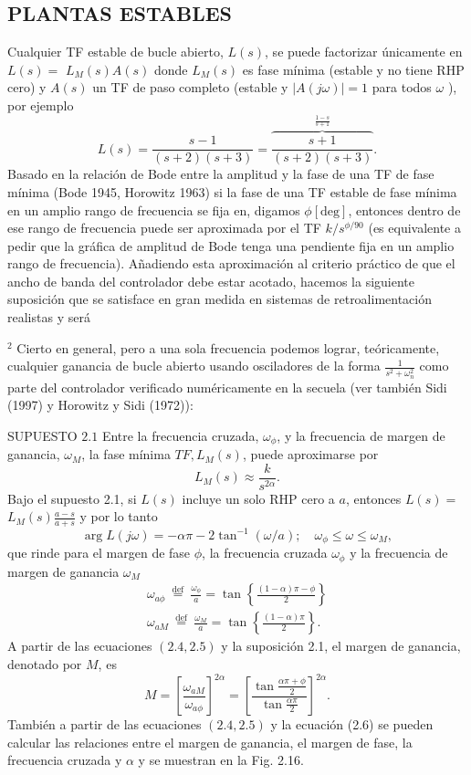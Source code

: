 \subsection{PLANTAS ESTABLES}
Cualquier TF estable de bucle abierto, $L(s)$, se puede factorizar únicamente en $L(s)=$ $L_{M}(s) A(s)$ donde $L_{M}(s)$ es fase mínima (estable y no tiene RHP cero) y $A(s)$ un TF de paso completo (estable y $| A(j \omega)|=1$ para todos $\omega$ ), por ejemplo
$$
L(s)=\frac{s-1}{(s+2)(s+3)}=\overbrace{\frac{s+1}{(s+2)(s+3)}}^{\frac{1-s}{s+1}} .
$$
Basado en la relación de Bode entre la amplitud y la fase de una TF de fase mínima (Bode 1945, Horowitz 1963) si la fase de una TF estable de fase mínima en un amplio rango de frecuencia se fija en, digamos $\phi[\mathrm{deg}]$, entonces dentro de ese rango de frecuencia puede ser aproximada por el TF $k / s^{\phi / 90}$ (es equivalente a pedir que la gráfica de amplitud de Bode tenga una pendiente fija en un amplio rango de frecuencia). Añadiendo esta aproximación al criterio práctico de que el ancho de banda del controlador debe estar acotado, hacemos la siguiente suposición que se satisface en gran medida en sistemas de retroalimentación realistas y será

${ }^{2}$ Cierto en general, pero a una sola frecuencia podemos lograr, teóricamente, cualquier ganancia de bucle abierto usando osciladores de la forma $\frac{1}{s^{2}+\omega_{n}^{2}}$ como parte del controlador verificado numéricamente en la secuela (ver también Sidi (1997) y Horowitz y Sidi (1972)):

SUPUESTO $2.1$ Entre la frecuencia cruzada, $\omega_{\phi}$, y la frecuencia de margen de ganancia, $\omega_{M}$, la fase mínima $T F, L_{M}(s)$, puede aproximarse por
$$
L_{M}(s) \approx \frac{k}{s^{2 \alpha}} .
$$
Bajo el supuesto 2.1, si $L(s)$ incluye un solo RHP cero a $a$, entonces $L(s)=$ $L_{M}(s) \frac{a-s}{a+s}$ y por lo tanto
$$
\arg L(j \omega)=-\alpha \pi-2 \tan ^{-1}(\omega / a) ; \quad \omega_{\phi} \leq \omega \leq \omega_{M},
$$
que rinde para el margen de fase $\phi$, la frecuencia cruzada $\omega_{\phi}$ y la frecuencia de margen de ganancia $\omega_{M}$
$$
\begin{gathered}
\omega_{a \phi} \stackrel{\text { def }}{=} \frac{\omega_{\phi}}{a}=\tan \left\{\frac{(1-\alpha) \pi-\phi}{2}\right\} \\
\omega_{a M} \stackrel{\text { def }}{=} \frac{\omega_{M}}{a}=\tan \left\{\frac{(1-\alpha) \pi}{2}\right\} .
\end{gathered}
$$
A partir de las ecuaciones $(2.4,2.5)$ y la suposición 2.1, el margen de ganancia, denotado por $M$, es
$$
M=\left[\frac{\omega_{a M}}{\omega_{a \phi}}\right]^{2 \alpha}=\left[\frac{\tan \frac{\alpha \pi+\phi}{2}}{\tan \frac{\alpha \pi}{2}}\right]^{2 \alpha} .
$$
También a partir de las ecuaciones $(2.4,2.5)$ y la ecuación (2.6) se pueden calcular las relaciones entre el margen de ganancia, el margen de fase, la frecuencia cruzada y $\alpha$ y se muestran en la Fig. 2.16.

